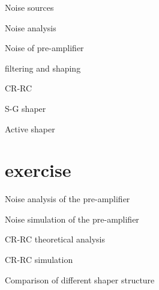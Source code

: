 \documentclass{beamer}
\begin{document}
\begin{frame}{Noise sources}

\end{frame}

\begin{frame}{Noise analysis}

\end{frame}

\begin{frame}{Noise of pre-amplifier}

\end{frame}

\begin{frame}{filtering and shaping}

\end{frame}

\begin{frame}{CR-RC}

\end{frame}

\begin{frame}{S-G shaper}

\end{frame}

\begin{frame}{Active shaper}

\end{frame}

\section{exercise}
\begin{frame}{Noise analysis of the pre-amplifier}

\end{frame}

\begin{frame}{Noise simulation of the pre-amplifier}

\end{frame}

\begin{frame}{CR-RC theoretical analysis}

\end{frame}

\begin{frame}{CR-RC simulation}

\end{frame}

\begin{frame}{Comparison of different shaper structure}

\end{frame}
\end{document}
